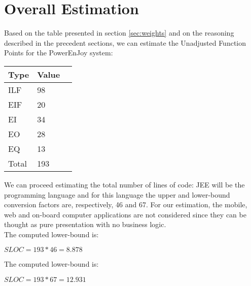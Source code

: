 \newpage
\section{Overall Estimation}
Based on the table presented in section \ref{sec:weights} and on the reasoning described in the precedent sections, we can estimate the Unadjusted Function Points for the PowerEnJoy system:

 \begin{center}
  \begin{tabular}{ |l|l|l| }
    \hline
    Type & Value \\ \hline
    ILF & 98 \\ \hline
    EIF & 20 \\ \hline
    EI & 34 \\ \hline
    EO & 28 \\ \hline
    EQ & 13 \\ \hline
    Total & 193 \\ \hline
  \end{tabular}
\end{center}

We can proceed estimating the total number of lines of code: JEE will be the programming language and for this language the upper and lower-bound conversion factors are, respectively, 46 and 67. For our estimation, the mobile, web and on-board computer applications are not considered since they can be thought as pure presentation with no business logic. \\

The computed lower-bound is: 
\\\begin{center}$ SLOC = 193 * 46 = 8.878 $ \end{center}


The computed lower-bound is: 
\\\begin{center}$ SLOC = 193 * 67 = 12.931 $ \end{center}
